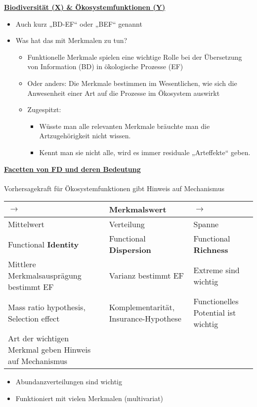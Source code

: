 \newpage
\underline{\textbf{Biodiversität (X) \& Ökosystemfunktionen (Y)}}
\begin{itemize}
	\item Auch kurz „BD-EF“ oder „BEF“ genannt
	\item Was hat das mit Merkmalen zu tun?
	\begin{itemize}
		\item Funktionelle Merkmale spielen eine wichtige Rolle bei der Übersetzung von Information (BD) in ökologische Prozesse (EF)
		\item Oder anders: Die Merkmale bestimmen im Wesentlichen, wie sich die Anwesenheit einer Art auf die Prozesse im Ökosystem auswirkt
		\item Zugespitzt:
		\begin{itemize}
			\item Wüsste man alle relevanten Merkmale bräuchte man die Artzugehörigkeit nicht wissen.
			\item Kennt man sie nicht alle, wird es immer residuale „Arteffekte“ geben.
		\end{itemize}
	\end{itemize}
\end{itemize}

\underline{\textbf{Facetten von FD und deren Bedeutung}}\\\\
Vorhersagekraft für Ökosystemfunktionen gibt Hinweis auf Mechanismus\\
\begin{tabularx}{\textwidth}{p{}p{}p{}}
	$\rightarrow$ & Merkmalswert & $\rightarrow$\\
	\hline
	Mittelwert & Verteilung & Spanne\\
	\hline
	Functional \textbf{Identity} & Functional \textbf{Dispersion} & Functional \textbf{Richness}\\
	\hline
	Mittlere Merkmalsausprägung bestimmt EF & Varianz bestimmt EF & Extreme sind wichtig\\
	Mass ratio hypothesis, Selection effect & Komplementarität, Insurance-Hypothese & Functionelles Potential ist wichtig\\
	Art der wichtigen Merkmal geben Hinweis auf Mechanismus& & \\
\end{tabularx}

\begin{itemize}
	\item Abundanzverteilungen sind wichtig
	\item Funktioniert mit vielen Merkmalen (multivariat)
\end{itemize}

